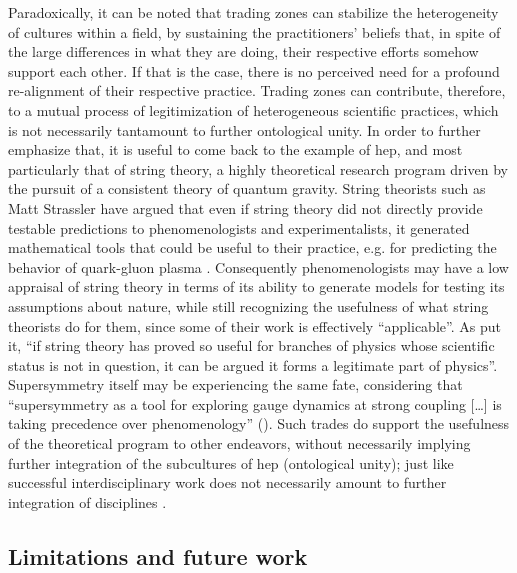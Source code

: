 \documentclass[smallextended]{svjour3}
\begin{document}
Paradoxically, it can be noted that trading zones can stabilize the heterogeneity of cultures within a field, by sustaining the practitioners' beliefs that, in spite of the large differences in what they are doing, their respective efforts somehow support each other. If that is the case, there is no perceived need for a profound re-alignment of their respective practice. Trading zones can contribute, therefore, to a mutual process of legitimization of heterogeneous scientific practices, which is not necessarily tantamount to further ontological unity. In order to further emphasize that, it is useful to come back to the example of \gls{hep}, and most particularly that of string theory, a highly theoretical research program driven by the pursuit of a consistent theory of quantum gravity. String theorists such as Matt Strassler have argued that even if string theory did not directly provide testable predictions to phenomenologists and experimentalists, it generated mathematical tools that could be useful to their practice, e.g. for predicting the behavior of quark-gluon plasma \citep{Ritson2021}. Consequently phenomenologists may have a low appraisal of string theory in terms of its ability to generate models for testing its assumptions about nature, while still recognizing the usefulness of what string theorists do for them, since some of their work is effectively ``applicable''. As \citet{Ritson2015} put it, ``if string theory has proved so useful for branches of physics whose scientific status is not in question, it can be argued it forms a legitimate part of physics''. Supersymmetry itself may be experiencing the same fate, considering that ``supersymmetry as a tool for exploring gauge dynamics at strong coupling [\dots] is taking precedence over phenomenology'' (\citealt[p.~7--8]{Shifman2020}). %
Such trades do support the usefulness of the theoretical program to other endeavors, without necessarily implying further integration of the subcultures of \gls{hep} (ontological unity); just like successful interdisciplinary work does not necessarily amount to further integration of disciplines \citep{GrneYanoff2016}. 

\subsection{Limitations and future work}
\end{document}
